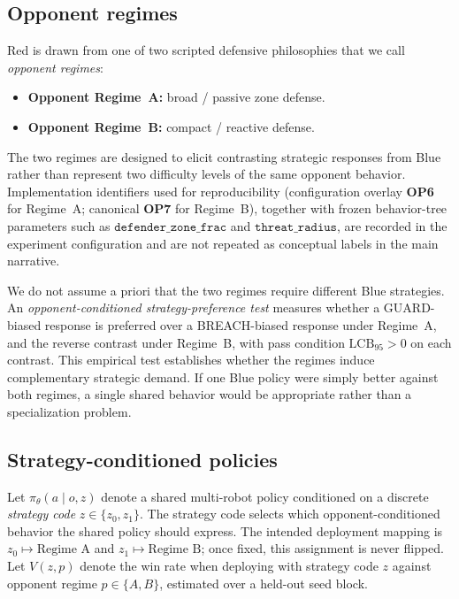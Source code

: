 \subsection{Opponent regimes}

Red is drawn from one of two scripted defensive philosophies that we call
\emph{opponent regimes}:
\begin{itemize}
  \item \textbf{Opponent Regime~A:} broad / passive zone defense.
  \item \textbf{Opponent Regime~B:} compact / reactive defense.
\end{itemize}
The two regimes are designed to elicit contrasting strategic responses from
Blue rather than represent two difficulty levels of the same opponent behavior.
Implementation identifiers used for reproducibility (configuration overlay
\textbf{OP6} for Regime~A; canonical \textbf{OP7} for Regime~B), together with
frozen behavior-tree parameters such as
$\texttt{defender\_zone\_frac}$ and $\texttt{threat\_radius}$, are recorded in
the experiment configuration and are not repeated as conceptual labels in the
main narrative.

We do not assume a priori that the two regimes require different Blue
strategies. An \emph{opponent-conditioned strategy-preference test} measures
whether a GUARD-biased response is preferred over a BREACH-biased response under
Regime~A, and the reverse contrast under Regime~B, with pass condition
$\mathrm{LCB}_{95}>0$ on each contrast. This empirical test establishes whether
the regimes induce complementary strategic demand. If one Blue policy were
simply better against both regimes, a single shared behavior would be
appropriate rather than a specialization problem.

\subsection{Strategy-conditioned policies}

Let $\pi_\theta(a\mid o,z)$ denote a shared multi-robot policy conditioned on a
discrete \emph{strategy code} $z\in\{z_0,z_1\}$. The strategy code selects which
opponent-conditioned behavior the shared policy should express. The intended
deployment mapping is $z_0\mapsto\text{Regime~A}$ and $z_1\mapsto\text{Regime~B}$;
once fixed, this assignment is never flipped. Let $V(z,p)$ denote the win rate
when deploying with strategy code $z$ against opponent regime
$p\in\{A,B\}$, estimated over a held-out seed block.

